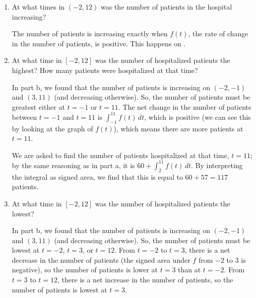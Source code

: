 \documentclass{article}
\begin{document}
\begin{enumerate}
\begin{enumerate}
\begin{enumerate}
    \item
      \begin{problem}[\vfill]      
        At what times in $(-2, 12)$ was the number of patients in the
        hospital increasing?
      \end{problem}

      \begin{solution}
        The number of patients is increasing exactly when $f(t)$, the rate
        of change in the number of patients, is positive.  This happens on
        .
      \end{solution}

    \item
      \begin{problem}[\vfill]
        At what time in $[-2, 12]$ was the number of hospitalized patients
        the highest?  How many patients were hospitalized at that time? 
      \end{problem}

      \begin{solution}
        In part b, we found that the number of
        patients is increasing on $(-2, -1)$ and $(3, 11)$ (and decreasing
        otherwise).  So, the number of patients must be greatest either at
        $t = -1$ or $t = 11$.  The net change in the number of patients
        between $t = -1$ and $t = 11$ is $\displaystyle \int_{-1}^{11}
        f(t)\,dt$, which is positive (we can see this by looking at the graph
        of $f(t)$), which means there are more patients at $\boxed{t =
          11}$.

        We are asked to find the number of patients hospitalized at that
        time, $t = 11$; by the same reasoning as in
        part a, it is $60 + \displaystyle
        \int_2^{11} f(t)\,dt$.  By interpreting the integral as signed area,
        we find that this is equal to $60 + 57 = \boxed{117}$ patients. 
      \end{solution}

    \item
      \begin{problem}[\vfill]
        At what time in $[-2, 12]$ was the number of hospitalized patients
        the lowest?  
      \end{problem}

      \begin{solution}
        In part b, we found that the number of
        patients is increasing on $(-2, -1)$ and $(3, 11)$ (and decreasing
        otherwise).  So, the number of patients must be lowest at $t = -2$,
        $t = 3$, or $t = 12$.  From $t = -2$ to $t = 3$, there is a net
        decrease in the number of patients (the signed area under $f$ from
        $-2$ to $3$ is negative), so the number of patients is lower at $t =
        3$ than at $t = -2$.  From $t = 3$ to $t = 12$, there is a net
        increase in the number of patients, so the number of patients is
        lowest at $\boxed{t = 3}$.
      \end{solution}
      

\end{enumerate}
\end{enumerate}
\end{enumerate}
\end{document}
